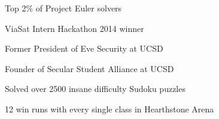 


\vspace{0.3cm}
\begin{cvitems}
\begin{small}
\item{Top 2\% of Project Euler solvers}
\item{ViaSat Intern Hackathon 2014 winner}
\item{Former President of Eve Security at UCSD}
\item{Founder of Secular Student Alliance at UCSD}
\item{Solved over 2500 insane difficulty Sudoku puzzles}
\item{12 win runs with every single class in Hearthstone Arena}
\end{small}
\end{cvitems}
